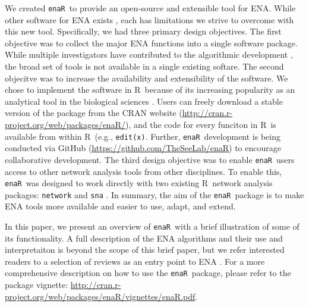 \documentclass[11pt]{article}
\newcommand{\R}{R}
\newcommand{\enaR}{\texttt{enaR}}
\begin{document}
\begin{spacing}{2}
We created \enaR\ to provide an open-source and extensible tool for
ENA.  While other software for ENA exists \citep{ulanowicz91,
  kazanci07, allesina04_wand, christensen04, fath06}, each has
limitations we strive to overcome with this new tool.  Specifically,
we had three primary design objectives.  The first objective was to
collect the major ENA functions into a single software package.  While
multiple investigators have contributed to the algorithmic development
\citep[e.g.,][]{finn76, ulanowicz86, ulanowicz91, fath99_review,
  allesina03}, the broad set of tools is not available in a single
existing softare.  The second objecitve was to increase the
availability and extensibility of the software. We chose to implement
the software in \R\ because of its increasing popularity as an
analytical tool in the biological sciences
\citep[e.g.,][]{dixon2003vegan, metcalf2012, revell2012phytools}.
Users can freely download a stable version of the package from the
CRAN website (\url{http://cran.r-project.org/web/packages/enaR/}), and
the code for every funciton in \R\ is available from within \R\ (e.g.,
\texttt{edit(x)}.  Further, \enaR\ development is being conducted via
GitHub (\url{https://github.com/TheSeeLab/enaR}) to encourage
collaborative development.  The third design objective was to enable
\enaR\ users access to other network analysis tools from other
disciplines.  To enable this, \enaR\ was designed to work directly
with two existing \R\ network analysis packages:  \texttt{network}
\citep{butts08_network} and \texttt{sna} \citep{butts08_social}.  In
summary, the aim of the \enaR\ package is to make ENA tools more
available and easier to use, adapt, and extend.

In this paper, we present an overview of \enaR\ with a brief
illustration of some of its functionality.  A full description of the
ENA algorithms and their use and interpretaiton is beyond the scope of
this brief paper, but we refer interested readers to a selection of
reviews as an entry point to ENA \citep{fath99_review, ulanowicz97, fath06,
  schramski11, jorgensen07_newecology}.  For a more comprehensive
description on how to use the \enaR\ package, please refer to the
package vignette:
\url{http://cran.r-project.org/web/packages/enaR/vignettes/enaR.pdf}.


\end{spacing}
\end{document}
